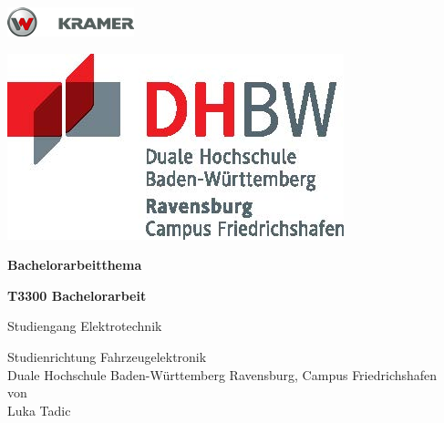 \documentclass[a4paper, 12pt]{article} %
\newcommand{\titel}{Bachelorarbeitthema}
\newcommand{\arbeit}{T3300 Bachelorarbeit}
\newcommand{\studiengang}{Elektrotechnik}
\newcommand{\studienrichtung}{Fahrzeugelektronik}
\newcommand{\autor}{Luka Tadic}
\begin{document}
\sloppy

\thispagestyle{empty}  %
\hypersetup{pageanchor=false}

\begin{titlepage}
\enlargethispage{4.0cm}
\sffamily  %

\parbox{0.5\linewidth}{%
    \begin{flushleft}
        \includegraphics[width=0.4\linewidth]{images/kramer.png}\\[5ex] %
    \end{flushleft}
}
\parbox{0.5\linewidth}{%
    \begin{flushright}
        \includegraphics[width=0.4\linewidth]{images/DHBW_d_R_FN_46mm_4c}\\[5ex] %
    \end{flushright}
}

\begin{center}

{\fontsize{20.74pt}{24pt}\selectfont
\textbf{\titel}\\[1.5ex]}

{\fontsize{17pt}{20pt}\selectfont
\textbf{\arbeit}\\[2ex]}

{\fontsize{14pt}{17pt}\selectfont
Studiengang \studiengang\\[2ex]}

{\fontsize{12pt}{14pt}\selectfont
Studienrichtung \studienrichtung\\[1ex]
Duale Hochschule Baden-Württemberg Ravensburg, Campus Friedrichshafen\\[5ex]
von\\[1ex]
\autor\\[15ex]}


\end{center}
\end{titlepage}
\end{document}
